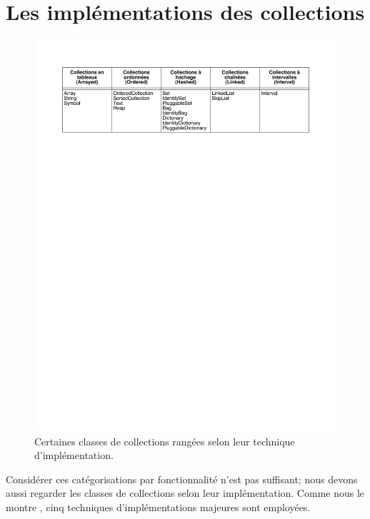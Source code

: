\documentclass[a4paper,10pt,twoside]{book}
\begin{document}
\section{Les impl\'ementations des collections}

\begin{figure}
\begin{center}
\includegraphics[width=\textwidth]{CollectionsByImpl}
\caption{Certaines classes de collections rang\'ees selon leur technique d'impl\'ementation.
    }
\end{center}
\end{figure}

Consid\'erer ces cat\'egorisations par fonctionnalit\'e n'est pas 
suffisant; nous devons aussi regarder les classes de collections selon
leur impl\'ementation. Comme nous le montre 
, cinq techniques d'impl\'ementations majeures 
sont employ\'ees.
\end{document}
